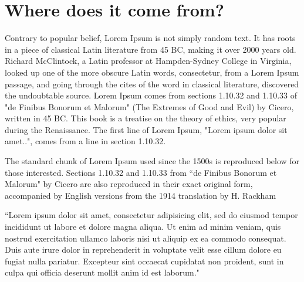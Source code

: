 \section{Where does it come from?}  %
\label{section1.3}

Contrary to popular belief, Lorem Ipsum is not simply random text. It has roots in a piece of classical Latin literature from 45 BC, making it over 2000 years old. Richard McClintock, a Latin professor at Hampden-Sydney College in Virginia, looked up one of the more obscure Latin words, consectetur, from a Lorem Ipsum passage, and going through the cites of the word in classical literature, discovered the undoubtable source. Lorem Ipsum comes from sections 1.10.32 and 1.10.33 of "de Finibus Bonorum et Malorum" (The Extremes of Good and Evil) by Cicero, written in 45 BC. This book is a treatise on the theory of ethics, very popular during the Renaissance. The first line of Lorem Ipsum, "Lorem ipsum dolor sit amet..", comes from a line in section 1.10.32.

The standard chunk of Lorem Ipsum used since the 1500s is reproduced below for those interested. Sections 1.10.32 and 1.10.33 from ``de Finibus Bonorum et Malorum" by Cicero are also reproduced in their exact original form, accompanied by English versions from the 1914 translation by H. Rackham

``Lorem ipsum dolor sit amet, consectetur adipisicing elit, sed do eiusmod tempor incididunt ut labore et dolore magna aliqua. Ut enim ad minim veniam, quis nostrud exercitation ullamco laboris nisi ut aliquip ex ea commodo consequat. Duis aute irure dolor in reprehenderit in voluptate velit esse cillum dolore eu fugiat nulla pariatur. Excepteur sint occaecat cupidatat non proident, sunt in culpa qui officia deserunt mollit anim id est laborum."

